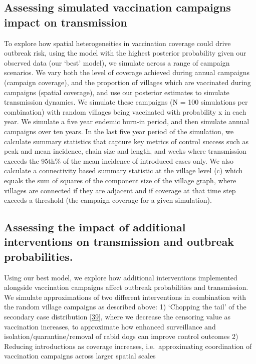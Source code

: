 \documentclass[
  oneside]{book}
\begin{document}
\hypertarget{assessing-simulated-vaccination-campaigns-impact-on-transmission}{%
\subsection{Assessing simulated vaccination campaigns impact on transmission}\label{assessing-simulated-vaccination-campaigns-impact-on-transmission}}

To explore how spatial heterogeneities in vaccination coverage could drive outbreak risk, using the model with the highest posterior probability given our observed data (our `best' model), we simulate across a range of campaign scenarios. We vary both the level of coverage achieved during annual campaigns (campaign coverage), and the proportion of villages which are vaccinated during campaigns (spatial coverage), and use our posterior estimates to simulate transmission dynamics. We simulate these campaigns (N = 100 simulations per combination) with random villages being vaccinated with probability x in each year. We simulate a five year endemic burn-in period, and then simulate annual campaigns over ten years. In the last five year period of the simulation, we calculate summary statistics that capture key metrics of control success such as peak and mean incidence, chain size and length, and weeks where transmission exceeds the 95th\% of the mean incidence of introduced cases only. We also calculate a connectivity based summary statistic at the village level (c) which equals the sum of squares of the component size of the village graph, where villages are connected if they are adjacent and if coverage at that time step exceeds a threshold (the campaign coverage for a given simulation).

\hypertarget{assessing-the-impact-of-additional-interventions-on-transmission-and-outbreak-probabilities.}{%
\subsection{Assessing the impact of additional interventions on transmission and outbreak probabilities.}\label{assessing-the-impact-of-additional-interventions-on-transmission-and-outbreak-probabilities.}}

Using our best model, we explore how additional interventions implemented alongside vaccination campaigns affect outbreak probabilities and transmission. We simulate approximations of two different interventions in combination with the random village campaigns as described above:
1) `Chopping the tail' of the secondary case distribution \protect\hyperlink{ref-Kain2020}{{[}39{]}}, where we decrease the censoring value as vaccination increases, to approximate how enhanced surveillance and isolation/quarantine/removal of rabid dogs can improve control outcomes
2) Reducing introductions as coverage increases, i.e.~approximating coordination of vaccination campaigns across larger spatial scales
\end{document}
